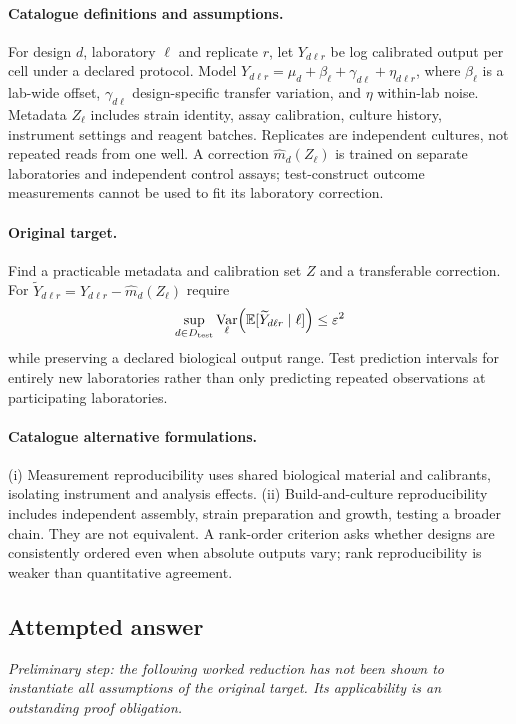 \documentclass[11pt]{article}
\newcommand{\E}{\mathbb E}
\DeclareMathOperator{\Var}{Var}
\providecommand{\E}{\mathbb E}
\providecommand{\Var}{\operatorname{Var}}
\begin{document}
\paragraph{Catalogue definitions and assumptions.}
For design $d$, laboratory $\ell$ and replicate $r$, let $Y_{d\ell r}$ be log calibrated output per cell under a declared protocol. Model $Y_{d\ell r}=\mu_d+\beta_\ell+\gamma_{d\ell}+\eta_{d\ell r}$, where $\beta_\ell$ is a lab-wide offset, $\gamma_{d\ell}$ design-specific transfer variation, and $\eta$ within-lab noise. Metadata $Z_\ell$ includes strain identity, assay calibration, culture history, instrument settings and reagent batches. Replicates are independent cultures, not repeated reads from one well. A correction $\widehat m_d(Z_\ell)$ is trained on separate laboratories and independent control assays; test-construct outcome measurements cannot be used to fit its laboratory correction.
\paragraph{Original target.}
Find a practicable metadata and calibration set $Z$ and a transferable correction. For $\widetilde Y_{d\ell r}=Y_{d\ell r}-\widehat m_d(Z_\ell)$ require
\[
\sup_{d\in D_{\rm test}}\Var_\ell\!\left(
\E[\widetilde Y_{d\ell r}\mid\ell]\right)\leq\varepsilon^2
\]
while preserving a declared biological output range. Test prediction intervals for entirely new laboratories rather than only predicting repeated observations at participating laboratories.
\paragraph{Catalogue alternative formulations.}
(i) Measurement reproducibility uses shared biological material and calibrants, isolating instrument and analysis effects. (ii) Build-and-culture reproducibility includes independent assembly, strain preparation and growth, testing a broader chain. They are not equivalent. A rank-order criterion asks whether designs are consistently ordered even when absolute outputs vary; rank reproducibility is weaker than quantitative agreement.
\subsection{Attempted answer}
\noindent\emph{Preliminary step: the following worked reduction has not been shown to instantiate all assumptions of the original target. Its applicability is an outstanding proof obligation.}
\end{document}
